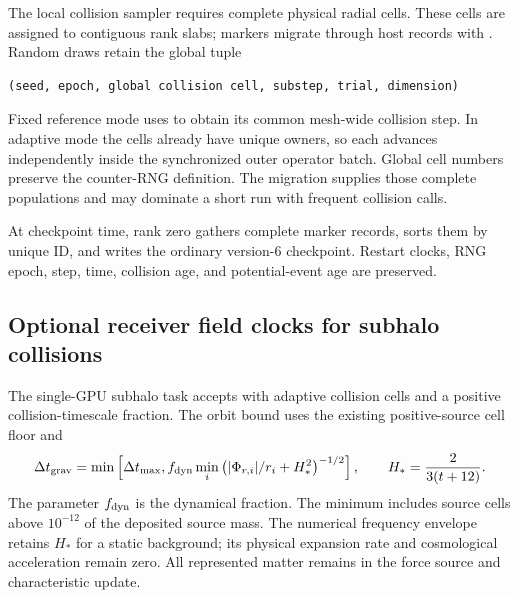 The local collision sampler requires complete physical radial cells. These
cells are assigned to contiguous rank slabs; markers migrate through host
records with .  Random draws retain the global tuple
\par\noindent\begin{minipage}{\linewidth}
\begin{lstlisting}
(seed, epoch, global collision cell, substep, trial, dimension)
\end{lstlisting}
\end{minipage}
Fixed reference mode uses  to obtain its common
mesh-wide collision step. In adaptive mode the cells already have unique
owners, so each advances independently inside the synchronized outer operator
batch.  Global cell numbers preserve the counter-RNG definition.
The migration supplies those complete populations and may dominate a short
run with frequent collision calls.

At checkpoint time, rank zero gathers complete marker records, sorts them by
unique ID, and writes the ordinary version-6 checkpoint.  Restart clocks,
RNG epoch, step, time, collision age, and potential-event age are preserved.

\subsection{Optional receiver field clocks for subhalo collisions}

The single-GPU subhalo task accepts 
with adaptive collision cells and a positive collision-timescale fraction.
The orbit bound uses the existing positive-source cell floor and
\begin{equation}
 \Delta t_{\rm grav}=\min\left[\Delta t_{\max},
 f_{\rm dyn}\min_i\left(|\Phi_{r,i}|/r_i+H_*^2\right)^{-1/2}\right],
 \qquad H_*={2\over3(t+12)}.
\end{equation}
The parameter \(f_{\rm dyn}\) is the dynamical fraction. The minimum
includes source cells above \(10^{-12}\) of the deposited source mass.
The numerical frequency envelope retains \(H_*\) for a static background;
its physical expansion rate and cosmological acceleration remain zero.
All represented matter remains in the force source and characteristic update.

